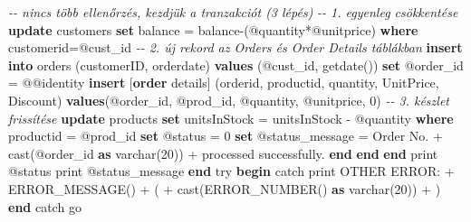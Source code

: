 \documentclass[
  magyar,
]{article}
\newenvironment{Shaded}{}{}
\newcommand{\CommentTok}[1]{\textcolor[rgb]{0.38,0.63,0.69}{\textit{#1}}}
\newcommand{\ControlFlowTok}[1]{\textcolor[rgb]{0.00,0.44,0.13}{\textbf{#1}}}
\newcommand{\DataTypeTok}[1]{\textcolor[rgb]{0.56,0.13,0.00}{#1}}
\newcommand{\DecValTok}[1]{\textcolor[rgb]{0.25,0.63,0.44}{#1}}
\newcommand{\FunctionTok}[1]{\textcolor[rgb]{0.02,0.16,0.49}{#1}}
\newcommand{\KeywordTok}[1]{\textcolor[rgb]{0.00,0.44,0.13}{\textbf{#1}}}
\newcommand{\NormalTok}[1]{#1}
\newcommand{\OperatorTok}[1]{\textcolor[rgb]{0.40,0.40,0.40}{#1}}
\newcommand{\StringTok}[1]{\textcolor[rgb]{0.25,0.44,0.63}{#1}}
\begin{document}
\begin{Shaded}
\begin{Highlighting}[]
              \CommentTok{{-}{-} nincs több ellenőrzés, kezdjük a tranzakciót (3 lépés)}
              \CommentTok{{-}{-} 1. egyenleg csökkentése}
              \KeywordTok{update}\NormalTok{ customers }\KeywordTok{set}\NormalTok{ balance }\OperatorTok{=}\NormalTok{ balance}\OperatorTok{{-}}\NormalTok{(@quantity}\OperatorTok{*}\NormalTok{@unitprice) }\KeywordTok{where}
\NormalTok{customerid}\OperatorTok{=}\NormalTok{@cust\_id}
              \CommentTok{{-}{-} 2. új rekord az Orders és Order Details táblákban}
              \KeywordTok{insert} \KeywordTok{into}\NormalTok{ orders (customerID, orderdate) }\KeywordTok{values}\NormalTok{ (@cust\_id, getdate())}
              \KeywordTok{set}\NormalTok{ @order\_id }\OperatorTok{=}\NormalTok{ @@identity}
              \KeywordTok{insert}\NormalTok{ [}\KeywordTok{order}\NormalTok{ details] (orderid, productid, quantity,}
\NormalTok{UnitPrice, Discount) }\KeywordTok{values}\NormalTok{(@order\_id, @prod\_id, @quantity, @unitprice, }\DecValTok{0}\NormalTok{)}
              \CommentTok{{-}{-} 3. készlet frissítése}
              \KeywordTok{update}\NormalTok{ products }\KeywordTok{set}\NormalTok{ unitsInStock }\OperatorTok{=}\NormalTok{ unitsInStock }\OperatorTok{{-}}\NormalTok{ @quantity}
\KeywordTok{where}\NormalTok{ productid }\OperatorTok{=}\NormalTok{ @prod\_id}
              \KeywordTok{set}\NormalTok{ @status }\OperatorTok{=} \DecValTok{0}
              \KeywordTok{set}\NormalTok{ @status\_message }\OperatorTok{=} \StringTok{\textquotesingle{}Order No. \textquotesingle{}} \OperatorTok{+} \FunctionTok{cast}\NormalTok{(@order\_id }\KeywordTok{as} \DataTypeTok{varchar}\NormalTok{(}\DecValTok{20}\NormalTok{)) }\OperatorTok{+} \StringTok{\textquotesingle{} processed successfully.\textquotesingle{}}
          \ControlFlowTok{end}
      \ControlFlowTok{end}
  \ControlFlowTok{end}
\NormalTok{  print @status}
\NormalTok{  print @status\_message}
\ControlFlowTok{end}\NormalTok{ try}
\ControlFlowTok{begin}\NormalTok{ catch}
\NormalTok{  print }\StringTok{\textquotesingle{}OTHER ERROR: \textquotesingle{}}\OperatorTok{+}\NormalTok{ ERROR\_MESSAGE() }\OperatorTok{+} \StringTok{\textquotesingle{} (\textquotesingle{}} \OperatorTok{+} \FunctionTok{cast}\NormalTok{(ERROR\_NUMBER() }\KeywordTok{as} \DataTypeTok{varchar}\NormalTok{(}\DecValTok{20}\NormalTok{)) }\OperatorTok{+} \StringTok{\textquotesingle{})\textquotesingle{}}
\ControlFlowTok{end}\NormalTok{ catch}
\NormalTok{go}
\end{Highlighting}
\end{Shaded}
\end{document}
